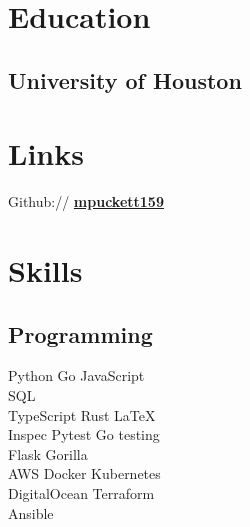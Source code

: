 \documentclass[letterpaper]{deedy-resume-openfont} %
\begin{document}
\begin{minipage}[t]{0.28\textwidth} %


\section{Education}
\subsection{University of Houston}




\section{Links}

Github:// \href{https://github.com/mpuckett159}{\bf mpuckett159 } \\


\section{Skills}

\subsection{Programming}

 Python \textbullet{} Go \textbullet{} JavaScript \\
 SQL \\
TypeScript \textbullet{} Rust \textbullet{} \LaTeX \\
Inspec \textbullet{} Pytest \textbullet{} Go testing \\
Flask \textbullet{} Gorilla \\
AWS \textbullet{} Docker \textbullet{} Kubernetes \\
DigitalOcean \textbullet{} Terraform \\
Ansible \\


\end{minipage}
\end{document}
